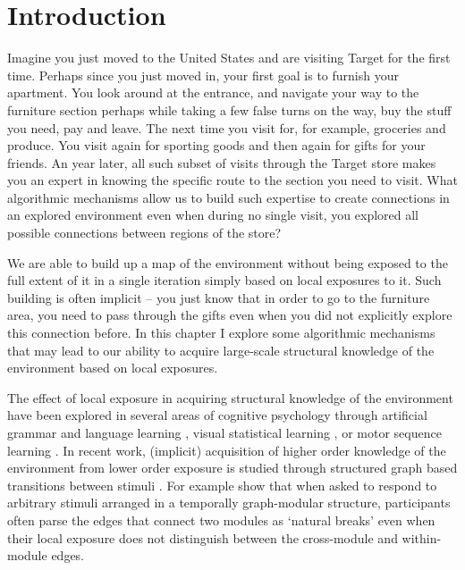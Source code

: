 \section{Introduction}

Imagine you just moved to the United States and are visiting Target for the first time. Perhaps since you just moved in, your first goal is to furnish your apartment. You look around at the entrance, and navigate your way to the furniture section perhaps while taking a few false turns on the way, buy the stuff you need, pay and leave. The next time you visit for, for example, groceries and produce. You visit again for sporting goods and then again for gifts for your friends. An year later, all such subset of visits through the Target store makes you an expert in knowing the specific route to the section you need to visit. What algorithmic mechanisms allow us to build such expertise to create connections in an explored environment even when during no single visit, you explored all possible connections between regions of the store?

We are able to build up a map of the environment without being exposed to the full extent of it in a single iteration simply based on local exposures to it. Such building is often implicit -- you just know that in order to go to the furniture area, you need to pass through the gifts even when you did not explicitly explore this connection before. In this chapter I explore some algorithmic mechanisms that may lead to our ability to acquire large-scale structural knowledge of the environment based on local exposures. 

The effect of local exposure in acquiring structural knowledge of the environment have been explored in several areas of cognitive psychology through artificial grammar and language learning \cite{knowlton1992intact, romberg2010statistical, aslin2012statistical, dehaene2015neural}, visual statistical learning \cite{fiser2002statistical, turk2008multidimensional, brady2008statistical}, or motor sequence learning \cite{baldwin2008segmenting, nissen1987attentional, cleeremans1991learning, kahn2018network}. In recent work, (implicit) acquisition of higher order knowledge of the environment from lower order exposure is studied through structured graph based transitions between stimuli \cite{schapiro2013neural, karuza2017process, kahn2018network, lynn2020humans, lynn2020human, karuza2022value}. For example \cite{schapiro2013neural} show that when asked to respond to arbitrary stimuli arranged in a temporally graph-modular structure, participants often parse the edges that connect two modules as `natural breaks' even when their local exposure does not distinguish between the cross-module and within-module edges. 

